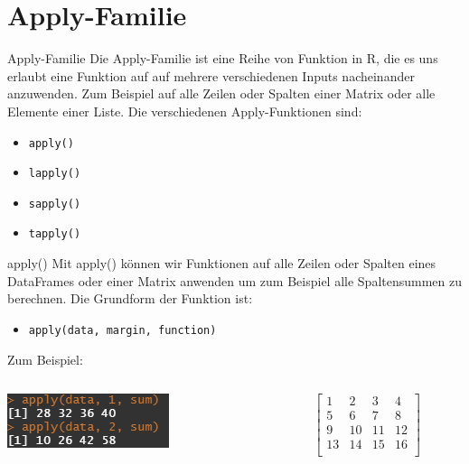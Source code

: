\documentclass[xcolor=dvipsnames, aspectratio = 169]{beamer}
\begin{document}
\section{Apply-Familie}
\begin{frame}[fragile]{Apply-Familie}
	Die Apply-Familie ist eine Reihe von Funktion in R, die es uns erlaubt eine Funktion auf auf mehrere verschiedenen Inputs nacheinander anzuwenden. Zum Beispiel auf alle Zeilen oder Spalten einer Matrix oder alle Elemente einer Liste. Die verschiedenen Apply-Funktionen sind:  
	\begin{itemize}
		\item \verb+apply()+
		\item \verb+lapply()+
		\item \verb+sapply()+
		\item \verb+tapply()+
	\end{itemize}
\end{frame}

\begin{frame}[fragile]{apply()}
	Mit apply() können wir Funktionen auf alle Zeilen oder Spalten eines DataFrames oder einer Matrix anwenden um zum Beispiel alle Spaltensummen zu berechnen. Die Grundform der Funktion ist:
	\begin{itemize}
		\item \verb+apply(data, margin, function)+
	\end{itemize}
	Zum Beispiel:
	\begin{columns}[T]
		\begin{column}{0.5\textwidth}
			\includegraphics{Apply}
		\end{column}
		\begin{column}{0.4\textwidth}
			\[
			\begin{bmatrix}
			    1 &2 &3 &4\\
			    5 &6 &7 &8\\
			    9 &10 &11 &12\\
			    13 &14 &15 &16\\
  			\end{bmatrix}
			\]
		\end{column}
	\end{columns}
	
\end{frame}
\end{document}
